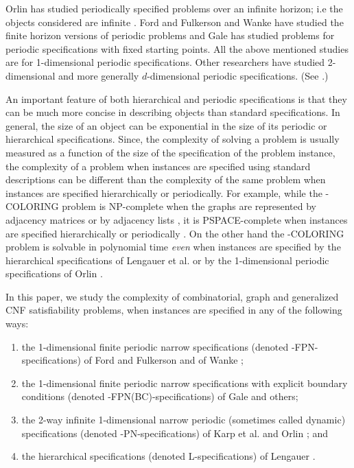 Orlin has studied periodically specified problems over an infinite 
horizon; i.e the objects considered are infinite \cite{Or82a}. 
Ford and Fulkerson \cite{FF58} and Wanke \cite{Wa93} have 
studied the finite horizon
versions of periodic problems and Gale \cite{Ga59} has studied problems for
periodic specifications with fixed starting points. All the above mentioned
studies are for 1-dimensional periodic specifications.
Other 
researchers have studied 2-dimensional and more generally $d$-dimensional
periodic specifications. (See  \cite{CM91,IS87,KO91,KS88,Wa93}.) 

An important feature of  both hierarchical and periodic 
specifications is that they
can be much  more concise in describing  objects than standard  specifications.
In general, the size of an object can be exponential in the
size of its periodic or hierarchical specifications.
Since, the  complexity of solving a problem 
is usually measured as a function of the size of the specification of the 
problem instance,  
the complexity of a problem when instances are specified using
standard descriptions can
be  different than the complexity of the same problem 
when instances are specified hierarchically or periodically.
For example, while the {-COLORING} problem is 
{\sf NP-}complete when the graphs are represented by adjacency matrices
or by adjacency lists \cite{GJ79}, it is 
{\sf PSPACE}-complete when instances are specified
hierarchically or periodically \cite{LW92,Or84b}.
On the other hand the {-COLORING} problem is solvable in polynomial time
{\em even} when instances are specified by the hierarchical
specifications of Lengauer et al. \cite{LW92,LW87a} or by  the 
1-dimensional periodic specifications of Orlin \cite{Or82a}.




In this paper, we study the complexity of combinatorial, graph and 
generalized {\sf CNF} satisfiability problems,
when instances are specified in any of the following ways:

\begin{enumerate}
\item
the 1-dimensional finite periodic narrow specifications (denoted 
{-FPN}-specifications) of Ford and Fulkerson \cite{FF58}
and of Wanke \cite{Wa93}; 
\item
the 1-dimensional finite periodic narrow specifications with explicit 
boundary conditions (denoted {-FPN(BC)}-specifications)
of Gale \cite{Ga59}
and others; 
\item
the 2-way infinite 1-dimensional narrow
periodic (sometimes called dynamic) specifications  (denoted
{-PN}-specifications) 
of Karp et al. and Orlin \cite{KMW67,Or82a}; and 
\item
the hierarchical specifications (denoted {\sf L}-specifications) of 
Lengauer \cite{LW87a}. 

\end{enumerate}


